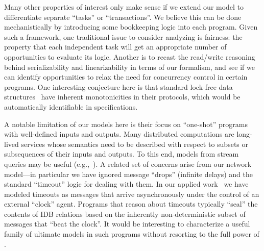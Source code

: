 Many other properties of interest only make sense if we extend our model to differentiate separate ``tasks'' or ``transactions''. We believe this can be done mechanistically by introducing some bookkeeping logic into each \lang program.  Given such a framework, one traditional issue to consider analyzing is fairness: the property that each independent task will get an appropriate number of opportunities to evaluate its logic.  Another is to recast the read/write reasoning behind serializability and linearizability in terms of our formalism, and see if we can identify opportunities to relax the need for concurrency control in certain programs.  One interesting conjecture here is that standard lock-free data structures~\cite{lockfree} have inherent monotonicities in their protocols, which would be automatically identifiable in \lang specifications.

A notable limitation of our models here is their focus on ``one-shot'' programs with well-defined inputs and outputs.  Many distributed computations are long-lived services whose semantics need to be described with respect to subsets or subsequences of their inputs and outputs.  To this end, models from stream queries may be useful (e.g.,~\cite{Chandramouli2009}).  A related set of concerns arise from our network model---in particular we have ignored message ``drops'' (infinite delays) and the standard ``timeout'' logic for dealing with them.  In our applied work~\cite{boom,cidr11} we have modeled timeouts as messages that arrive asynchronously under the control of an external ``clock'' agent.  Programs that reason about timeouts typically ``seal'' the contents of IDB relations based on the inherently non-deterministic subset of messages that ``beat the clock''.  It would be interesting to characterize a useful family of ultimate models in such programs without resorting to the full power of \lang.